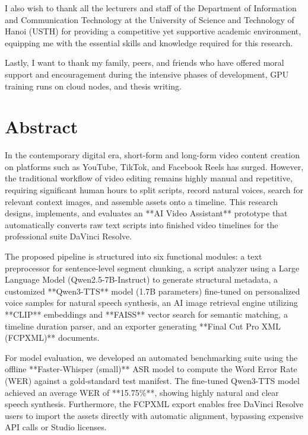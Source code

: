 \documentclass[a4paper,12pt]{report}
\begin{document}
I also wish to thank all the lecturers and staff of the Department of Information and Communication Technology at the University of Science and Technology of Hanoi (USTH) for providing a competitive yet supportive academic environment, equipping me with the essential skills and knowledge required for this research.

Lastly, I want to thank my family, peers, and friends who have offered moral support and encouragement during the intensive phases of development, GPU training runs on cloud nodes, and thesis writing.
\newpage

\chapter*{Abstract}
In the contemporary digital era, short-form and long-form video content creation on platforms such as YouTube, TikTok, and Facebook Reels has surged. However, the traditional workflow of video editing remains highly manual and repetitive, requiring significant human hours to split scripts, record natural voices, search for relevant context images, and assemble assets onto a timeline. This research designs, implements, and evaluates an **AI Video Assistant** prototype that automatically converts raw text scripts into finished video timelines for the professional suite DaVinci Resolve.

The proposed pipeline is structured into six functional modules: a text preprocessor for sentence-level segment chunking, a script analyzer using a Large Language Model (Qwen2.5-7B-Instruct) to generate structural metadata, a customized **Qwen3-TTS** model (1.7B parameters) fine-tuned on personalized voice samples for natural speech synthesis, an AI image retrieval engine utilizing **CLIP** embeddings and **FAISS** vector search for semantic matching, a timeline duration parser, and an exporter generating **Final Cut Pro XML (FCPXML)** documents. 

For model evaluation, we developed an automated benchmarking suite using the offline **Faster-Whisper (small)** ASR model to compute the Word Error Rate (WER) against a gold-standard test manifest. The fine-tuned Qwen3-TTS model achieved an average WER of **15.75\%**, showing highly natural and clear speech synthesis. Furthermore, the FCPXML export enables free DaVinci Resolve users to import the assets directly with automatic alignment, bypassing expensive API calls or Studio licenses.
\newpage
\end{document}
